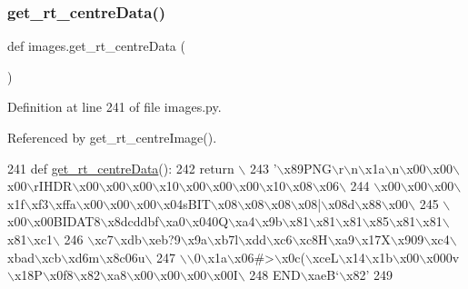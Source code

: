 \subsubsection{\texorpdfstring{get\+\_\+rt\+\_\+centre\+Data()}{get\_rt\_centreData()}}
{\footnotesize\ttfamily def images.\+get\+\_\+rt\+\_\+centre\+Data (\begin{DoxyParamCaption}{ }\end{DoxyParamCaption})}



Definition at line 241 of file images.\+py.



Referenced by get\+\_\+rt\+\_\+centre\+Image().


\begin{DoxyCode}
241 \textcolor{keyword}{def }\hyperlink{namespaceimages_a80588d0b3c45479bb59dc2e48c1023f4}{get\_rt\_centreData}():
242     \textcolor{keywordflow}{return} \(\backslash\)
243 \textcolor{stringliteral}{'\(\backslash\)x89PNG\(\backslash\)r\(\backslash\)n\(\backslash\)x1a\(\backslash\)n\(\backslash\)x00\(\backslash\)x00\(\backslash\)x00\(\backslash\)rIHDR\(\backslash\)x00\(\backslash\)x00\(\backslash\)x00\(\backslash\)x10\(\backslash\)x00\(\backslash\)x00\(\backslash\)x00\(\backslash\)x10\(\backslash\)x08\(\backslash\)x06\(\backslash\)}
244 \textcolor{stringliteral}{\(\backslash\)x00\(\backslash\)x00\(\backslash\)x00\(\backslash\)x1f\(\backslash\)xf3\(\backslash\)xffa\(\backslash\)x00\(\backslash\)x00\(\backslash\)x00\(\backslash\)x04sBIT\(\backslash\)x08\(\backslash\)x08\(\backslash\)x08\(\backslash\)x08|\(\backslash\)x08d\(\backslash\)x88\(\backslash\)x00\(\backslash\)}
245 \textcolor{stringliteral}{\(\backslash\)x00\(\backslash\)x00BIDAT8\(\backslash\)x8dcddbf\(\backslash\)xa0\(\backslash\)x040Q\(\backslash\)xa4\(\backslash\)x9b\(\backslash\)x81\(\backslash\)x81\(\backslash\)x81\(\backslash\)x85\(\backslash\)x81\(\backslash\)x81\(\backslash\)x81\(\backslash\)xc1\(\backslash\)}
246 \textcolor{stringliteral}{\(\backslash\)xc7\(\backslash\)xdb\(\backslash\)xeb?9\(\backslash\)x9a\(\backslash\)xb7l\(\backslash\)xdd\(\backslash\)xc6\(\backslash\)xc8H\(\backslash\)xa9\(\backslash\)x17X\(\backslash\)x909\(\backslash\)xc4\(\backslash\)xbad\(\backslash\)xcb\(\backslash\)xd6m\(\backslash\)x8c06u\(\backslash\)}
247 \textcolor{stringliteral}{\(\backslash\)\(\backslash\)0\(\backslash\)x1a\(\backslash\)x06#>\(\backslash\)x0c(\(\backslash\)xceL\(\backslash\)x14\(\backslash\)x1b\(\backslash\)x00\(\backslash\)x000v\(\backslash\)x18P\(\backslash\)x0f8\(\backslash\)x82\(\backslash\)xa8\(\backslash\)x00\(\backslash\)x00\(\backslash\)x00\(\backslash\)x00I\(\backslash\)}
248 \textcolor{stringliteral}{END\(\backslash\)xaeB`\(\backslash\)x82'}
249 
\end{DoxyCode}
\mbox{\label{namespaceimages_ad0a504a5948c2d661187be424a907f77}} 
